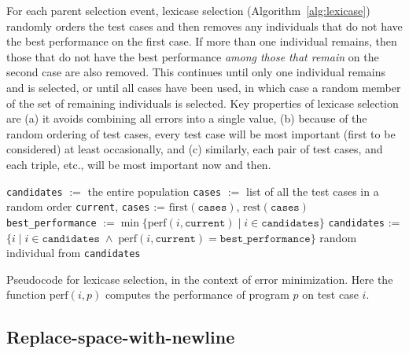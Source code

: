 For each parent selection event, lexicase selection (Algorithm~\ref{alg:lexicase})
randomly orders the test cases and then removes any individuals  
that do not have the best performance on the first case. 
If more than one individual remains, then those that do not have the best performance 
\emph{among those that remain} on the second case are 
also removed. This 
continues until only one individual remains and is selected, or until all cases 
have been used, in which case a random member of the set of remaining individuals is selected.
Key properties of lexicase selection are (a) it avoids combining all  errors into a single
value, (b) because of the random ordering of test cases, every test case will be
most important (first to be considered) at least occasionally, and (c) similarly, each pair of test cases, 
and each triple, etc., will be most important now and then. 

\begin{algorithm}[tb]
	\begin{algorithmic}
		\STATE \texttt{candidates} $:=$ the entire population
		\STATE \texttt{cases} $:=$ list of all the test cases in a random order
		\STATE \texttt{current}, \texttt{cases} := $\textrm{first}(\texttt{cases})$, $\textrm{rest}(\texttt{cases})$
		\STATE \texttt{best\_performance} $:= \min \{ \textrm{perf}(i, \texttt{current}) \;|\; i \in \texttt{candidates} \}$
		\STATE \texttt{candidates} := $\{ i \;|\; i \in \texttt{candidates} \;\land\; \textrm{perf}(i, \texttt{current}) = \texttt{best\_performance}\}$
		\ENDWHILE
		\RETURN random individual from \texttt{candidates}
	\end{algorithmic}
	\caption{Pseudocode for lexicase selection, in the context of error minimization. Here the
		function $\textrm{perf}(i, p)$ computes the performance of program $p$ on test case $i$.}
	\label{alg:lexicase}
\end{algorithm}

\subsection{Replace-space-with-newline}


